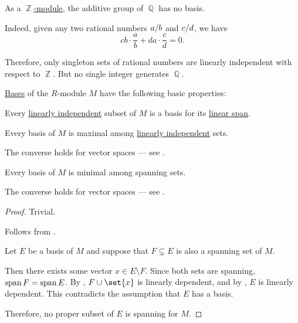 \begin{example}\label{ex:module_without_basis}
  As a \hyperref[thm:abelian_group_is_module]{\( \BbbZ \)-module}, the additive group of \( \BbbQ \) has no basis.

  Indeed, given any two rational numbers \( \ifrac a b \) and \( \ifrac c d \), we have
  \begin{equation*}
    cb \cdot \frac a b + da \cdot \frac c d = 0.
  \end{equation*}

  Therefore, only singleton sets of rational numbers are linearly independent with respect to \( \BbbZ \). But no single integer generates \( \BbbQ \).
\end{example}

\begin{proposition}\label{thm:def:hamel_basis}
  \hyperref[def:hamel_basis]{Bases} of the \( R \)-module \( M \) have the following basic properties:
  \begin{thmenum}
     Every \hyperref[def:linear_dependence]{linearly independent} subset of \( M \) is a basis for its \hyperref[def:semimodule/submodel]{linear span}.

     Every basis of \( M \) is maximal among \hyperref[thm:def:linear_dependence]{linearly independent} sets.

    The converse holds for vector spaces --- see .

     Every basis of \( M \) is minimal among spanning sets.

    The converse holds for vector spaces --- see .
  \end{thmenum}
\end{proposition}
\begin{proof}
   Trivial.

   Follows from .

   Let \( E \) be a basis of \( M \) and suppose that \( F \subsetneq E \) is also a spanning set of \( M \).

  Then there exists some vector \( x \in E \setminus F \). Since both sets are spanning, \( \operatorname{span} F = \operatorname{span} E \). By , \( F \cup \set{ x } \) is linearly dependent, and by , \( E \) is linearly dependent. This contradicts the assumption that \( E \) has a basis.

  Therefore, no proper subset of \( E \) is spanning for \( M \).
\end{proof}

